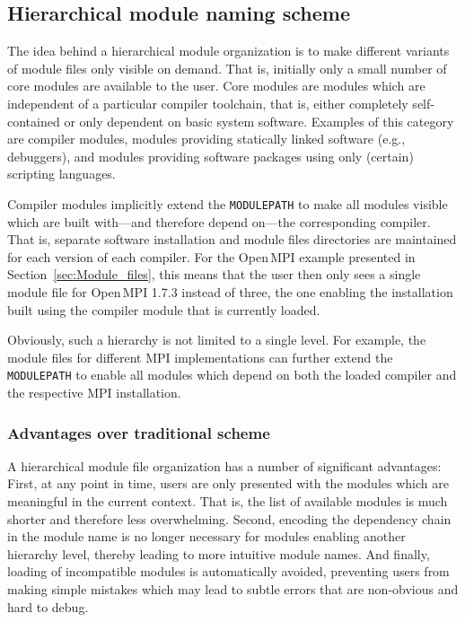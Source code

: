 
\subsection{Hierarchical module naming scheme}

The idea behind a hierarchical module organization is to make different
variants of module files only visible on demand. That is, initially only a
small number of core modules are available to the user. Core modules are
modules which are independent of a particular compiler toolchain, that is,
either completely self-contained or only dependent on basic system software.
Examples of this category are compiler modules, modules providing statically
linked software (e.g., debuggers), and modules providing software packages
using only (certain) scripting languages.

Compiler modules implicitly extend the \texttt{MODULEPATH} to make all
modules visible which are built with---and therefore depend on---the
corresponding compiler. That is, separate software installation and module
files directories are maintained for each version of each compiler. For the
Open\,MPI example presented in Section~\ref{sec:Module_files}, this means
that the user then only sees a single module file for Open\,MPI 1.7.3 instead
of three, the one enabling the installation built using the compiler module
that is currently loaded.

Obviously, such a hierarchy is not limited to a single level. For example,
the module files for different MPI implementations can further extend the
\texttt{MODULEPATH} to enable all modules which depend on both the loaded
compiler and the respective MPI installation.

\subsubsection{Advantages over traditional scheme}


A hierarchical module file organization has a number of significant
advantages: First, at any point in time, users are only presented with the
modules which are meaningful in the current context. That is, the list of
available modules is much shorter and therefore less overwhelming. Second,
encoding the dependency chain in the module name is no longer necessary for
modules enabling another hierarchy level, thereby leading to more intuitive
module names. And finally, loading of incompatible modules is automatically
avoided, preventing users from making simple mistakes which may lead to
subtle errors that are non-obvious and hard to debug.

